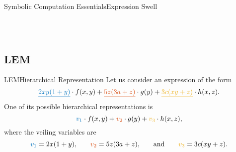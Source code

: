 \begin{frame}{Symbolic Computation Essentials}{Expression Swell}
{{\begin{tabular}{cc}
  \end{tabular}}} \\[0.5em]
\end{frame}

\subsection{\acl{LEM}}

\begin{frame}{\acl{LEM}}{Hierarchical Representation}
  Let us consider an expression of the form
  \begin{equation*}
    \textcolor{mycolor1}{\underline{2xy(1+y)}} \cdot f(x,y) +
    \textcolor{mycolor2}{\underline{5z(3a+z)}} \cdot g(y) +
    \textcolor{mycolor3}{\underline{3c(xy+z)}} \cdot h(x,z) \text{.}
  \end{equation*}
  One of its possible hierarchical representations is
  \begin{equation*}
    \textcolor{mycolor1}{v_1} \cdot f(x,y) +
    \textcolor{mycolor2}{v_2} \cdot g(y) +
    \textcolor{mycolor3}{v_3} \cdot h(x,z) \text{,}
  \end{equation*}
  where the veiling variables are
  \begin{equation*}
    \textcolor{mycolor1}{v_1} = 2x(1+y) \text{,}
    \qquad
    \textcolor{mycolor2}{v_2} = 5z(3a+z) \text{,}
    \qquad \text{and} \qquad
    \textcolor{mycolor3}{v_3} = 3c(xy+z) \text{.}
  \end{equation*}
\end{frame}

